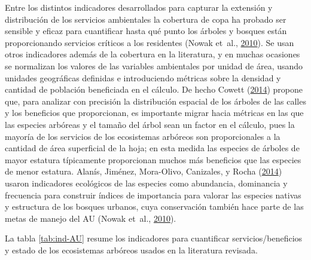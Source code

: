 \documentclass[12pt,a4paper,openany]{book}
\theoremstyle{definition}
\theoremstyle{definition}
\theoremstyle{definition}
\theoremstyle{remark}
\begin{document}
Entre los distintos indicadores desarrollados para capturar la extensión
y distribución de los servicios ambientales la cobertura de copa ha
probado ser sensible y eficaz para cuantificar hasta qué punto los
árboles y bosques están proporcionando servicios críticos a los
residentes (Nowak et~al.,
\protect\hyperlink{ref-nowak_sustaining_2010}{2010}). Se usan otros
indicadores además de la cobertura en la literatura, y en muchas
ocasiones se normalizan los valores de las variables ambientales por
unidad de área, usando unidades geográficas definidas e introduciendo
métricas sobre la densidad y cantidad de población beneficiada en el
cálculo. De hecho Cowett
(\protect\hyperlink{ref-cowett_methodology_2014}{2014}) propone que,
para analizar con precisión la distribución espacial de los árboles de
las calles y los beneficios que proporcionan, es importante migrar hacia
métricas en las que las especies arbóreas y el tamaño del árbol sean un
factor en el cálculo, pues la mayoría de los servicios de los
ecosistemas arbóreos son proporcionales a la cantidad de área
superficial de la hoja; en esta medida las especies de árboles de mayor
estatura típicamente proporcionan muchos más beneficios que las especies
de menor estatura. Alanís, Jiménez, Mora-Olivo, Canizales, y Rocha
(\protect\hyperlink{ref-alanis_estructura_2014}{2014}) usaron
indicadores ecológicos de las especies como abundancia, dominancia y
frecuencia para construir índices de importancia para valorar las
especies nativas y estructura de los bosques urbanos, cuya conservación
también hace parte de las metas de manejo del AU (Nowak et~al.,
\protect\hyperlink{ref-nowak_sustaining_2010}{2010}).

La tabla \ref{tab:ind-AU} resume los indicadores para cuantificar
servicios/beneficios y estado de los ecosistemas arbóreos usados en la
literatura revisada.
\end{document}
